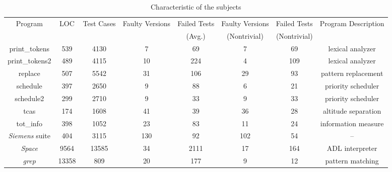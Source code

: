 \documentclass{sig-alternate}
\begin{document}
\begin{table}[t]
\caption{Characteristic of the subjects}\label{tab:subjects} \center
\begin{tabular}{|c|c|c|c|c|c|c|c|}
%

\hline  Program &   LOC &   Test Cases  &   Faulty Versions & Failed
Tests & Faulty Versions     &   Failed Tests
    &   Program Description \\
 & &  &  & (Avg.) & (Nontrivial) & (Nontrivial) & \\

\hline  print\_tokens   &   539 &   4130    &   7   &   69    &   7   &   69    &   lexical analyzer    \\
\hline  print\_tokens2  &   489 &   4115    &   10  &   224   &   4   &   109   &   lexical analyzer    \\
\hline  replace &   507 &   5542    &   31  &   106   &   29  &   93    &   pattern replacement \\
\hline  schedule    &   397 &   2650    &   9   &   88    &   6   &   21  &   priority scheduler  \\
\hline  schedule2   &   299 &   2710    &   9   &   33    &   9   &   33    &   priority scheduler  \\
\hline  tcas    &   174 &   1608    &   41  &   39    &   36  &   28    &   altitude separation \\
\hline  tot\_info &   398 &   1052    &   23  &   83    &   11  &   24    &   information measure \\
\hline  \emph{Siemens} suite & 404 & 3115 & 130 & 92 & 102 & 54 & -- \\
\hline  \emph{Space}   &   9564    &   13585   &   34  &   2111    &   17  &   164   &   ADL interpreter \\
\hline  \emph{grep}    &   13358   &   809 &   20  &   177 &   9   &   12    &   pattern matching    \\

\hline
\end{tabular}
\end{table}
\end{document}
